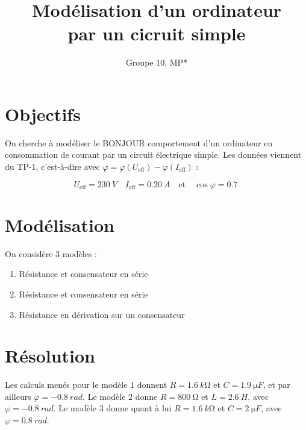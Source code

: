\documentclass{article}
\title{Modélisation d'un ordinateur\\
\small{par un cicruit simple}}
\author{Groupe 10, MP*}
\newcommand{\eff}{_\text{eff}}
\begin{document}
\maketitle

\section{Objectifs}

On cherche à modéliser le BONJOUR comportement d'un ordinateur en consommation de courant par un circuit électrique simple. Les données viennent du TP-1, c'est-à-dire avec $\varphi = \varphi(U\eff) - \varphi(I\eff)$ :

$$U\eff = \SI{230}{V} \quad I\eff = \SI{0,20}{A} \quad \text{et} \quad \cos \varphi = \SI{0,7}{}$$

\section{Modélisation}

On considère 3 modèles :
\begin{enumerate}
    \item Résistance et consensateur en série
    \item Résistance et consensateur en série
    \item Résistance en dérivation sur un consensateur
\end{enumerate}

\section{Résolution}

Les calculs menés pour le modèle 1 donnent $R = \SI{1,6}{k\ohm}$ et $C = \SI{1,9}{\micro F}$, et par ailleurs $\varphi = \SI{-0,8}{rad}$.
Le modèle 2 donne $R = \SI{800}{\ohm}$ et $L = \SI{2,6}{H}$, avec $\varphi = \SI{-0,8}{rad}$.
Le modèle 3 donne quant à lui $R = \SI{1,6}{k\ohm}$ et $C = \SI{2}{\micro F}$, avec $\varphi = \SI{0,8}{rad}$.
\end{document}
